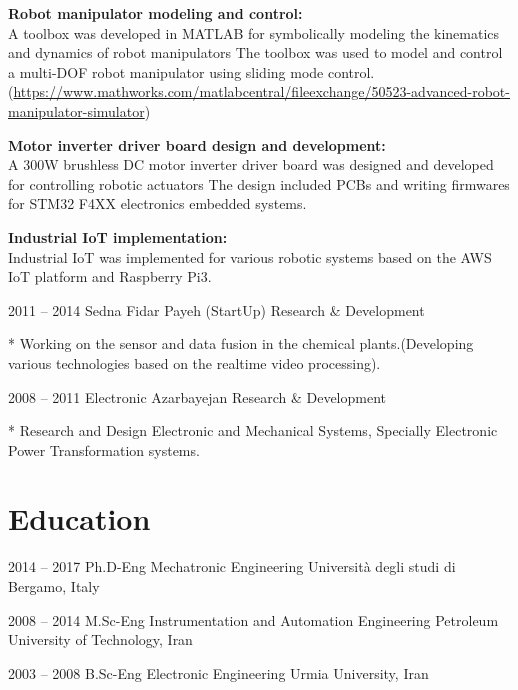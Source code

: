 \documentclass[fontsize=12pt]{tccv}
\begin{document}
\begin{eventlist}
		\small \textbf{Robot manipulator modeling and control:}\\		
		A toolbox was developed in MATLAB for symbolically modeling the kinematics and dynamics of robot manipulators
		The toolbox was used to model and control a multi-DOF robot manipulator using sliding mode control.
		(\url{https://www.mathworks.com/matlabcentral/fileexchange/50523-advanced-robot-manipulator-simulator})
		
		\small \textbf{Motor inverter driver board design and development:}\\		
		A 300W brushless DC motor inverter driver board was designed and developed for controlling robotic actuators
		The design included PCBs and writing firmwares for STM32 F4XX electronics embedded systems.
		
		\small \textbf{Industrial IoT implementation:}\\		
		Industrial IoT was implemented for various robotic systems based on the AWS IoT platform and Raspberry Pi3.
		
		
		\vspace{-3mm}
		\item{2011 -- 2014}
		{Sedna Fidar Payeh (StartUp)}
		{Research \& Development}
		
		* Working on the sensor and data fusion in the chemical plants.(Developing various technologies based on the realtime video processing).
		
		\item{2008 -- 2011}
		{Electronic Azarbayejan}
		{Research \& Development}
		
		* Research and Design Electronic and Mechanical Systems, Specially Electronic Power Transformation systems.
		
	\end{eventlist}
	\vspace{-10mm}
	\section{Education}
	
	\begin{yearlist}
		
		\item{\small 2014 -- 2017}
		{Ph.D-Eng Mechatronic Engineering}
		{Università degli studi di Bergamo, Italy}
		
		\item{\small 2008 -- 2014}
		{M.Sc-Eng Instrumentation and Automation Engineering}
		{Petroleum University of Technology, Iran}
		
		\item{\small 2003 -- 2008}
		{B.Sc-Eng Electronic Engineering}
		{Urmia University, Iran}
		
	\end{yearlist}
	\vspace{-10mm}
\end{document}
